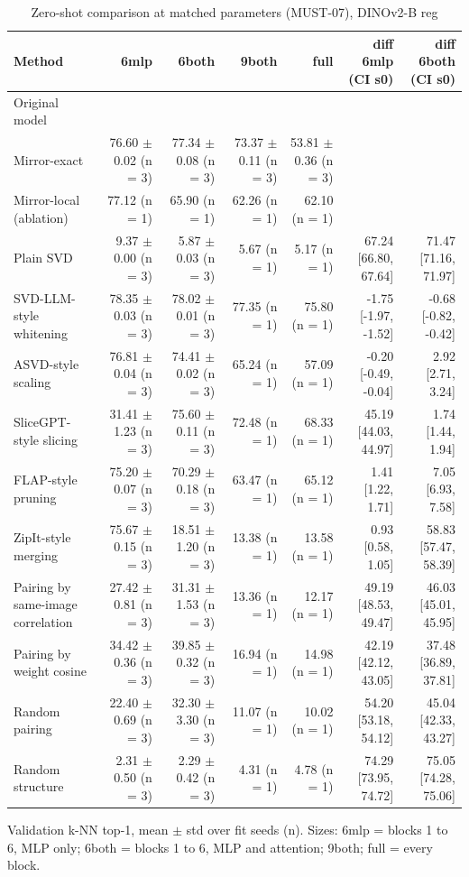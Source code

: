 \begin{table}[t]
\centering
\small
\caption{Zero-shot comparison at matched parameters (MUST-07), DINOv2-B reg}
\label{tab:table3a_compressors}
\begin{tabular}{lrrrrrr}
\toprule
Method & 6mlp & 6both & 9both & full & diff 6mlp (CI s0) & diff 6both (CI s0) \\
\midrule
Original model &  &  &  &  &  &  \\
Mirror-exact & 76.60 $\pm$ 0.02 (n = 3) & 77.34 $\pm$ 0.08 (n = 3) & 73.37 $\pm$ 0.11 (n = 3) & 53.81 $\pm$ 0.36 (n = 3) &  &  \\
Mirror-local (ablation) & 77.12 (n = 1) & 65.90 (n = 1) & 62.26 (n = 1) & 62.10 (n = 1) &  &  \\
Plain SVD & 9.37 $\pm$ 0.00 (n = 3) & 5.87 $\pm$ 0.03 (n = 3) & 5.67 (n = 1) & 5.17 (n = 1) & 67.24 [66.80, 67.64] & 71.47 [71.16, 71.97] \\
SVD-LLM-style whitening & 78.35 $\pm$ 0.03 (n = 3) & 78.02 $\pm$ 0.01 (n = 3) & 77.35 (n = 1) & 75.80 (n = 1) & -1.75 [-1.97, -1.52] & -0.68 [-0.82, -0.42] \\
ASVD-style scaling & 76.81 $\pm$ 0.04 (n = 3) & 74.41 $\pm$ 0.02 (n = 3) & 65.24 (n = 1) & 57.09 (n = 1) & -0.20 [-0.49, -0.04] & 2.92 [2.71, 3.24] \\
SliceGPT-style slicing & 31.41 $\pm$ 1.23 (n = 3) & 75.60 $\pm$ 0.11 (n = 3) & 72.48 (n = 1) & 68.33 (n = 1) & 45.19 [44.03, 44.97] & 1.74 [1.44, 1.94] \\
FLAP-style pruning & 75.20 $\pm$ 0.07 (n = 3) & 70.29 $\pm$ 0.18 (n = 3) & 63.47 (n = 1) & 65.12 (n = 1) & 1.41 [1.22, 1.71] & 7.05 [6.93, 7.58] \\
ZipIt-style merging & 75.67 $\pm$ 0.15 (n = 3) & 18.51 $\pm$ 1.20 (n = 3) & 13.38 (n = 1) & 13.58 (n = 1) & 0.93 [0.58, 1.05] & 58.83 [57.47, 58.39] \\
Pairing by same-image correlation & 27.42 $\pm$ 0.81 (n = 3) & 31.31 $\pm$ 1.53 (n = 3) & 13.36 (n = 1) & 12.17 (n = 1) & 49.19 [48.53, 49.47] & 46.03 [45.01, 45.95] \\
Pairing by weight cosine & 34.42 $\pm$ 0.36 (n = 3) & 39.85 $\pm$ 0.32 (n = 3) & 16.94 (n = 1) & 14.98 (n = 1) & 42.19 [42.12, 43.05] & 37.48 [36.89, 37.81] \\
Random pairing & 22.40 $\pm$ 0.69 (n = 3) & 32.30 $\pm$ 3.30 (n = 3) & 11.07 (n = 1) & 10.02 (n = 1) & 54.20 [53.18, 54.12] & 45.04 [42.33, 43.27] \\
Random structure & 2.31 $\pm$ 0.50 (n = 3) & 2.29 $\pm$ 0.42 (n = 3) & 4.31 (n = 1) & 4.78 (n = 1) & 74.29 [73.95, 74.72] & 75.05 [74.28, 75.06] \\
\bottomrule
\end{tabular}
\par\smallskip\footnotesize Validation k-NN top-1, mean $\pm$ std over fit seeds (n). Sizes: 6mlp = blocks 1 to 6, MLP only; 6both = blocks 1 to 6, MLP and attention; 9both; full = every block.
\end{table}
